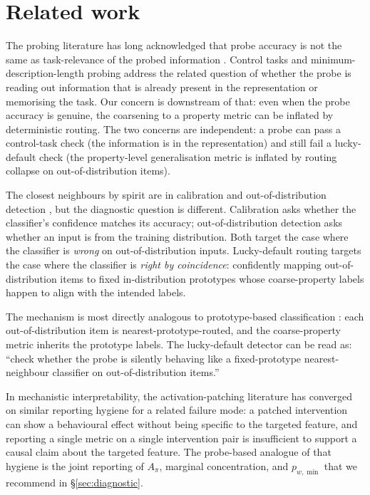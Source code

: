 \documentclass[11pt,letterpaper]{article}
\newcommand{\pwmin}{\texorpdfstring{\ensuremath{p_{w,\min}}}{p\_(w,min)}}
\begin{document}
\section{Related work}
\label{sec:related}

The probing literature has long acknowledged that probe accuracy is
not the same as task-relevance of the probed information
\citep{belinkov2022probing,hewitt2019probes,ravichander2021probing,
pimentel2020mdl,alain2017probes}. Control tasks
\citep{hewitt2019probes} and minimum-description-length probing
\citep{pimentel2020mdl} address the related question of whether the
probe is reading out information that is already present in the
representation or memorising the task. Our concern is downstream of
that: even when the probe accuracy is genuine, the
coarsening to a property metric can be inflated by deterministic
routing. The two concerns are independent: a probe can pass a
control-task check (the information is in the representation) and
still fail a lucky-default check (the property-level
generalisation metric is inflated by routing collapse on
out-of-distribution items).

The closest neighbours by spirit are in calibration
\citep{guo2017calibration} and out-of-distribution detection
\citep{hendrycks2017baseline,liang2018odin,lee2018mahalanobis}, but
the diagnostic question is different. Calibration asks whether the
classifier's confidence matches its accuracy; out-of-distribution
detection asks whether an input is from the training distribution.
Both target the case where the classifier is \emph{wrong} on
out-of-distribution inputs. Lucky-default routing targets the case
where the classifier is \emph{right by coincidence}: confidently
mapping out-of-distribution items to fixed in-distribution
prototypes whose coarse-property labels happen to align with the
intended labels.

The mechanism is most directly analogous to prototype-based
classification \citep{snell2017protonets,mensink2013ncm}: each
out-of-distribution item is nearest-prototype-routed, and the
coarse-property metric inherits the prototype labels. The
lucky-default detector can be read as: ``check whether the probe
is silently behaving like a fixed-prototype nearest-neighbour
classifier on out-of-distribution items.''

In mechanistic interpretability, the activation-patching
literature \citep{heimersheim2024patching,zhang2024patchingbest}
has converged on similar reporting hygiene for a related failure
mode: a patched intervention can show a behavioural effect without
being specific to the targeted feature, and reporting a single
metric on a single intervention pair is insufficient to support a
causal claim about the targeted feature. The probe-based analogue
of that hygiene is the joint reporting of $A_\pi$, marginal
concentration, and \pwmin{} that we recommend in
\S\ref{sec:diagnostic}.
\end{document}
